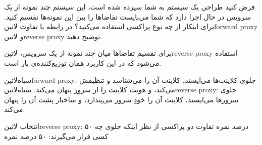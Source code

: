 
فرض کنید طراحی یک سیستم به شما سپرده شده است، این سیستم چند نمونه از یک سرویس در حال اجرا دارد که شما می‌بایست تقاضاها را بین این نمونه‌ها تقسیم کنید. برای اینکار از چه نوع پراکسی استفاده می‌کنید؟
در رابطه با تفاوت ‌لاتین{forward proxy} و ‌لاتین{reverse proxy} توضیح دهید.


\begin{پاسخ}

برای تقسیم تقاضاها میان چند نمونه از یک سرویس، ‌لاتین{reverse proxy} استفاده می‌شود که در این کاربرد همان توزیع‌کننده‌ی بار است.

 ‌سیاه{‌لاتین{forward proxy}}: جلوی کلاینت‌ها می‌ایستد، کلاینت آن را می‌شناسد و تنظیمش می‌کند، و هویت کلاینت را از سرور پنهان می‌کند.
 ‌سیاه{‌لاتین{reverse proxy}}: جلوی سرورها می‌ایستد، کلاینت آن را خودِ سرور می‌پندارد، و ساختار پشت آن را پنهان می‌کند.

 انتخاب ‌لاتین{reverse proxy}: ۵۰ درصد نمره
 تفاوت دو پراکسی از نظر اینکه جلوی چه کسی قرار می‌گیرند: ۵۰ درصد نمره

\end{پاسخ}

